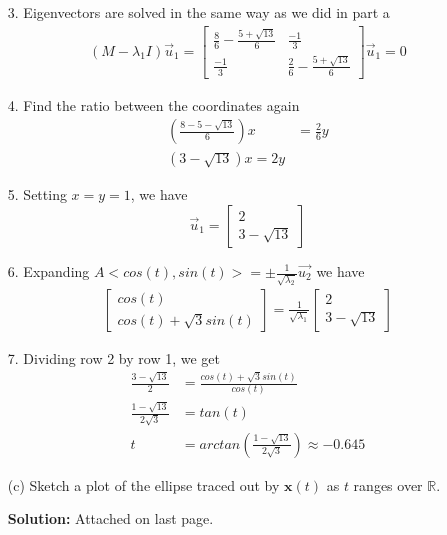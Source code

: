 \documentclass[12pt]{article}
\begin{document}
\begin{enumerate}
          3. Eigenvectors are solved in the same way as we did in part a
          \begin{align*}
              ( M-\lambda_{1}I)\vec{u}_1 = \begin{bmatrix} \frac{8}{6} - \frac{5+\sqrt{13}}{6} & \frac{-1}{3} \\ \frac{-1}{3} & \frac{2}{6}-\frac{5+\sqrt{13}}{6} \end{bmatrix} \vec{u}_1 = 0
          \end{align*}

          4. Find the ratio between the coordinates again
          \begin{align}
              (\frac{8-5-\sqrt{13}}{6})x & = \frac{2}{6}y \\
              (3-\sqrt{13})x = 2y
          \end{align}

          5. Setting $x=y=1$, we have
          \[
              \vec{u}_1 = \begin{bmatrix} 2 \\ 3-\sqrt{13} \end{bmatrix}
          \]

          6. Expanding $A <cos(t), sin(t)> = \pm{\frac{1}{\sqrt{\lambda{}_2}}}\vec{u_2}$ we have
          \begin{align*}
              \begin{bmatrix} cos(t) \\ cos(t) + \sqrt{3}sin(t) \end{bmatrix} = \frac{1}{\sqrt{\lambda_{1}}}\begin{bmatrix} 2 \\ 3 - \sqrt{13} \end{bmatrix}
          \end{align*}

          7. Dividing row 2 by row 1, we get
          \begin{align*}
              \frac{3-\sqrt{13}}{2}         & = \frac{cos(t) + \sqrt{3}sin(t)}{cos(t)}                \\
              \frac{1-\sqrt{13}}{2\sqrt{3}} & = tan(t)                                                \\
              t                             & = arctan(\frac{1-\sqrt{13}}{2\sqrt{3}}) \approx{-0.645}
          \end{align*}

    \item[(c)] Sketch a plot of the ellipse traced out by $\mathbf{x}(t)$ as $t$ ranges over $\mathbb{R}$.

          \textbf{Solution:} Attached on last page.
\end{enumerate}
\end{document}

